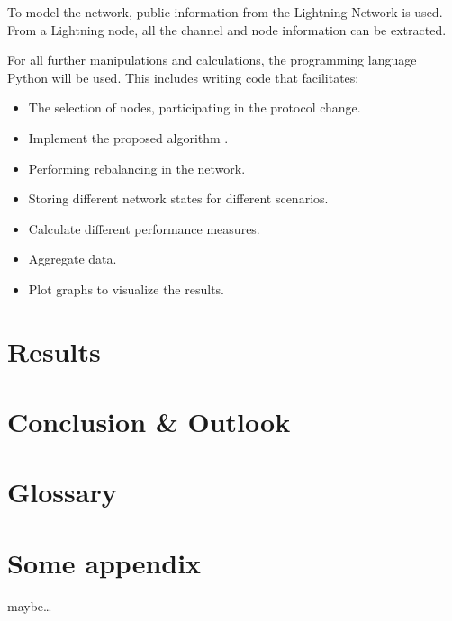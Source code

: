 \documentclass[final]{fhnwreport}       %
\begin{document}
To model the network, public information from the Lightning Network is used. From a Lightning node, all the channel and node information can be extracted.

For all further manipulations and calculations, the programming language Python will be used. This includes writing code that facilitates: 
\begin{itemize}
  \item The selection of nodes, participating in the protocol change.
  \item Implement the proposed algorithm \cite[p.~3]{pickhardt_imbalance_2019}.
  \item Performing rebalancing in the network.
  \item Storing different network states for different scenarios.
  \item Calculate different performance measures.
  \item Aggregate data.
  \item Plot graphs to visualize the results.
\end{itemize}


\section{Results}
\section{Conclusion \& Outlook}

\newpage
{\sloppypar
{}
\printbibliography
\label{sec:lit}
}


\newpage
{}
\section*{Glossary}
\printglossaries

\appendix
\section{Some appendix}
maybe\ldots

{%
}
\end{document}

